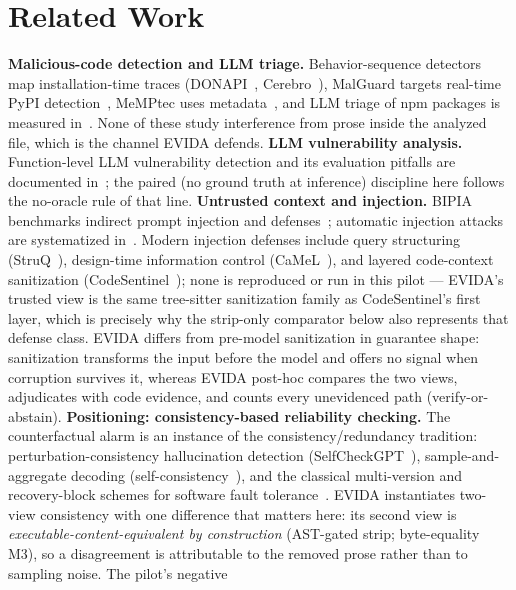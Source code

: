 \documentclass[sigconf,nonacm]{acmart}
\begin{document}
\section{Related Work}\label{sec:related}
\textbf{Malicious-code detection and LLM triage.} Behavior-sequence
detectors map installation-time traces (DONAPI~\cite{huang2024donapi},
Cerebro~\cite{zhang2025cerebro}), MalGuard targets real-time PyPI
detection~\cite{gao2025malguard}, MeMPtec uses
metadata~\cite{halder2024memptec}, and LLM triage of npm packages is
measured in~\cite{zahan2025npm}. None of these study interference from
prose inside the analyzed file, which is the channel EVIDA defends.
\textbf{LLM vulnerability analysis.} Function-level LLM vulnerability
detection and its evaluation pitfalls are documented
in~\cite{ding2025primevul,han2023howfar,sun2024llm4vuln}; the paired
(no ground truth at inference) discipline here follows the no-oracle rule
of that line.
\textbf{Untrusted context and injection.} BIPIA benchmarks indirect prompt
injection and defenses~\cite{yi2023bipia}; automatic injection attacks are
systematized in~\cite{liu2024autopi}. Modern injection defenses include
query structuring (StruQ~\cite{chen2024struq}), design-time information
control (CaMeL~\cite{debenedetti2025camel}), and layered code-context
sanitization (CodeSentinel~\cite{cheng2026codesentinel}); none is
reproduced or run in this pilot --- EVIDA's trusted view is the same
tree-sitter sanitization family as CodeSentinel's first layer, which is
precisely why the strip-only comparator below also represents that
defense class. EVIDA differs from pre-model sanitization in guarantee
shape: sanitization transforms the input before the model and offers no
signal when corruption survives it, whereas EVIDA post-hoc compares the
two views, adjudicates with code evidence, and counts every unevidenced
path (verify-or-abstain).
\textbf{Positioning: consistency-based reliability checking.} The
counterfactual alarm is an instance of the consistency/redundancy
tradition: perturbation-consistency hallucination detection
(SelfCheckGPT~\cite{manakul2023selfcheckgpt}), sample-and-aggregate
decoding (self-consistency~\cite{wang2023selfconsistency}), and the
classical multi-version and recovery-block schemes for software fault
tolerance~\cite{avizienis1985nversion,randell1975recovery}. EVIDA
instantiates two-view consistency with one difference that matters here:
its second view is \emph{executable-content-equivalent by construction}
(AST-gated strip; byte-equality M3), so a disagreement is attributable to
the removed prose rather than to sampling noise. The pilot's negative
\end{document}

